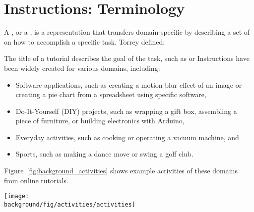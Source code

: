 
\section{Instructions: Terminology}
\label{background_terms}

A , or a , is a representation that transfers domain-specific  by describing a set of  on how to accomplish a specific task. Torrey \ea{} \cite{Torrey:2007he} defined:
\begin{quote}
\end{quote}
%
The title of a tutorial describes the goal of the task, such as  or 
%
Instructions have been widely created for various domains, including:

\begin{itemize}
  \item Software applications, such as creating a motion blur effect of an image or creating a pie chart from a spreadsheet using specific software,
  \item Do-It-Yourself (DIY) projects, such as wrapping a gift box, assembling a piece of furniture, or building electronics with Arduino,
  \item Everyday activities, such as cooking or operating a vacuum machine, and
  \item Sports, such as making a dance move or swing a golf club.
\end{itemize}

Figure~\ref{fig:background_activities} shows example activities of these domains from online tutorials.
\\

\begin{figure*}[b!]
  \centering
  \begin{minipage}{\textwidth}
  \texttt{[image: \\background/fig/activities/activities]}
  \caption[Example activities in tutorial domains.]{Example activities in tutorial domains:
  a) image manipulations using a software application
  \footnote{Photoshop Playbook: Selective Focus, \url{https://youtu.be/Wh3ahxqDnyw}},
  b) wrapping a gift, a DIY task
  \footnote{One Kings Lane: How to Wrap the Perfect Gift, \url{https://youtu.be/Me3ykrZobJE}},
  c) cooking, an everyday activity
  \footnote{Slow-cooked black treacle ham, \url{http://www.bbc.co.uk/food/recipes/slow-cooked_black_21152}}, and
  d) ballet dancing in sports
  \footnote{Ballet 101: How to Do the Fouette in Ballet Dancing, \url{https://youtu.be/DzqQNlaahjs}}.
  }
  \label{fig:background_activities}
  \end{minipage}
\end{figure*}

